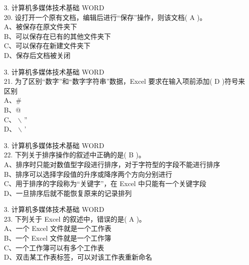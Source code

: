 \documentclass[aspectratio=169]{beamer}
\begin{document}
\begin{frame}[t]{3. 计算机多媒体技术基础} \vspace{20pt}
    WORD\\
20. 设打开一个原有文档，编辑后进行“保存”操作，则该文档( A )。\\
A、被保存在原文件夹下\\
B、可以保存在已有的其他文件夹下\\
C、可以保存在新建文件夹下\\
D、保存后文档被关闭\\
\end{frame}




\begin{frame}[t]{3. 计算机多媒体技术基础} \vspace{20pt}
    WORD\\

21. 为了区别“数字”和“数字字符串”数据，Excel 要求在输入项前添加( D )符号来区别\\
A、\# \\
    B、@ \\

    C、  $\backslash $ ” \\

    D、 $\backslash $ ’\\
\end{frame}



\begin{frame}[t]{3. 计算机多媒体技术基础} \vspace{20pt}
    WORD\\
22. 下列关于排序操作的叙述中正确的是( B )。\\
A、排序时只能对数值型字段进行排序，对于字符型的字段不能进行排序\\
B、排序可以选择字段值的升序或降序两个方向分别进行\\
C、用于排序的字段称为“关键字”，在 Excel 中只能有一个关键字段\\
D、一旦排序后就不能恢复原来的记录排列\\
\end{frame}




\begin{frame}[t]{3. 计算机多媒体技术基础} \vspace{20pt}
    WORD\\
23. 下列关于 Excel 的叙述中，错误的是( A )。\\
A、一个 Excel 文件就是一个工作表\\
B、一个 Excel 文件就是一个工作簿\\
C、一个工作簿可以有多个工作表\\
D、双击某工作表标签，可以对该工作表重新命名\\
\end{frame}
\end{document}
